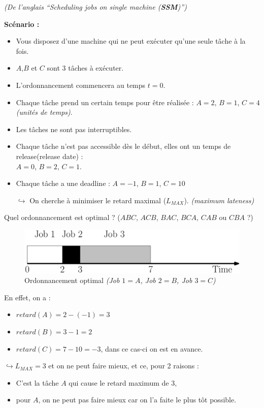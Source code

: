 \documentclass{article}
\begin{document}
\begin{sffamily}
\begin{flushright}\textit{(De l'anglais ``Scheduling jobs on single machine (\textbf{SSM})'')}\end{flushright}
\textbf{Scénario :}
\begin{itemize}
\item Vous disposez d'une machine qui ne peut exécuter qu'une seule tâche à la fois.
\item $A$,$B$ et $C$ sont $3$ tâches à exécuter.
\item L'ordonnancement commencera au temps $t = 0$.
\item Chaque tâche prend un certain temps pour être réalisée : $A = 2$, $B = 1$, $C = 4$ \textit{(unités de temps)}.
\item Les tâches ne sont pas interruptibles.
\item Chaque tâche n'est pas accessible dès le début, elles ont un temps de release(release date) :\\ $A = 0$, $B = 2$, $C = 1$.
\item Chaque tâche a une deadline : $A = -1$, $B = 1$, $C = 10$
\item[$\hookrightarrow$] On cherche à minimiser le retard maximal ($L_{MAX}$). \textit{(maximum lateness)}
\end{itemize}

Quel ordonnancement est optimal ? ($ABC$, $ACB$, $BAC$, $BCA$, $CAB$ ou $CBA$ ?)

\begin{figure}[h!]
    \begin{center}
    \includegraphics[scale=0.2]{ordo.pdf}
    \caption{Ordonnancement optimal \textit{(Job $1 = A$, Job $2 = B$, Job $3 = C$)}}
    \end{center}	
\end{figure}
\noindent En effet, on a :
\begin{itemize}
\item $retard(A) = 2 - (-1) = 3$
\item $retard(B) = 3 - 1 = 2$
\item $retard(C) = 7 - 10 = -3$, dans ce cas-ci on est en avance.
\end{itemize}

$\hookrightarrow L_{MAX} = 3$ et on ne peut faire mieux, et ce, pour 2 raisons :
\begin{itemize}
\item C'est la tâche $A$ qui cause le retard maximum de $3$,
\item pour $A$, on ne peut pas faire mieux car on l'a faite le plus tôt possible.
\end{itemize}


\end{sffamily}
\end{document}
